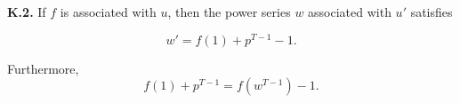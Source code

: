 \textbf{K.2.} If $f$ is associated with $u$, then the power series $w$ associated with $u'$ satisfies

$$w' = f(1) + p^{T-1} - 1.$$

Furthermore,
$$f(1) + p^{T-1} = f(w^{T-1}) - 1.$$
